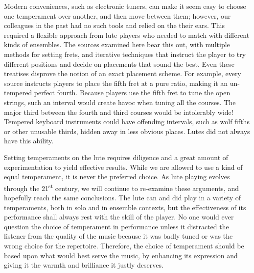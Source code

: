 Modern conveniences, such as electronic tuners, can make it seem easy to choose one temperament over
another, and then move between them; however, our colleagues in the past had no such tools and
relied on the their ears.  This required a flexible approach from lute players who needed to match
with different kinds of ensembles.  The sources examined here bear this out, with multiple methods
for setting frets, and iterative techniques that instruct the player to try different positions and
decide on placements that sound the best.  Even these treatises disprove the notion of an exact
placement scheme. For example, every source instructs players to place the fifth fret at a pure
ratio, making it an un-tempered perfect fourth.  Because players use the fifth fret to tune the open
strings, such an interval would create havoc when tuning all the courses. The major third between
the fourth and third courses would be intolerably wide!  Tempered keyboard instruments could have
offending intervals, such as wolf fifths or other unusable thirds, hidden away in less obvious
places.  Lutes did not always have this ability.

Setting temperaments on the lute requires diligence and a great amount of experimentation to yield
effective results.  While we are allowed to use a kind of equal temperament, it is never the
preferred choice.  As lute playing evolves through the 21\textsuperscript{st} century, we will
continue to re-examine these arguments, and hopefully reach the same conclusions. The lute can and
did play in a variety of temperaments, both in solo and in ensemble contexts, but the effectiveness
of its performance shall always rest with the skill of the player. No one would ever question the
choice of temperament in performance unless it distracted the listener from the quality of the music
because it was badly tuned or was the wrong choice for the repertoire.  Therefore, the choice  of
temperament should be based upon what would best serve the music, by enhancing its expression and
giving it the warmth and brilliance it justly deserves.
